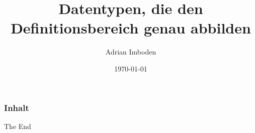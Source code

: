 \documentclass{beamer}
\title[]{Datentypen, die den Definitionsbereich genau abbilden}
\subtitle[]{}
\author{Adrian Imboden}
\institute[]
{%
\smallskip\\
\textit{adi@thingdust.com}\\
\textit{adrian.imboden@komaxgroup.com}
\medskip\\
\url{https://github.com/adrianimboden/cppusergroup-domain-driven-datatypes}\\
}
\date{\today} %
\begin{document}
\begin{frame}
	\titlepage%
\end{frame}

\begin{frame}
	\frametitle{Inhalt}
	\tableofcontents[]
\end{frame}




\begin{frame}[fragile]
	\begin{figure}[ht]
		\centering
	\end{figure}
	\Huge{\centerline{The End}}
\end{frame}
\end{document}
